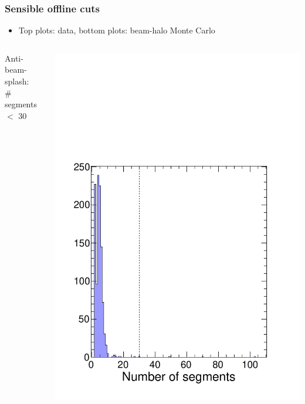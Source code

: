 \documentclass[compress]{beamer}
\begin{document}
\begin{frame}
\frametitle{Sensible offline cuts}
\label{thispage}

\begin{itemize}
\item Top plots: data, bottom plots: beam-halo Monte Carlo
\end{itemize}

\begin{columns}
Anti-beam-splash: \\ \# segments $<$ 30 \\ \mbox{ }

\includegraphics[width=\linewidth]{tworuns_numsegments.pdf}


\end{columns}
\end{frame}
\end{document}
